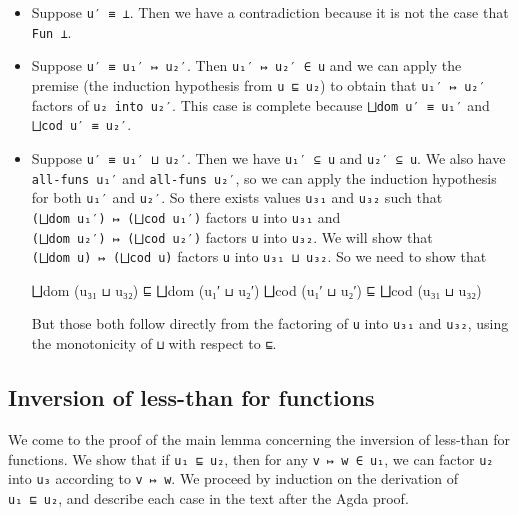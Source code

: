 \begin{itemize}
\item
  Suppose \texttt{u′\ ≡\ ⊥}. Then we have a contradiction because it is
  not the case that \texttt{Fun\ ⊥}.
\item
  Suppose \texttt{u′\ ≡\ u₁′\ ↦\ u₂′}. Then \texttt{u₁′\ ↦\ u₂′\ ∈\ u}
  and we can apply the premise (the induction hypothesis from
  \texttt{u\ ⊑\ u₂}) to obtain that \texttt{u₁′\ ↦\ u₂′} factors of
  \texttt{u₂\ into\ u₂′}. This case is complete because
  \texttt{⨆dom\ u′\ ≡\ u₁′} and \texttt{⨆cod\ u′\ ≡\ u₂′}.
\item
  Suppose \texttt{u′\ ≡\ u₁′\ ⊔\ u₂′}. Then we have \texttt{u₁′\ ⊆\ u}
  and \texttt{u₂′\ ⊆\ u}. We also have \texttt{all-funs\ u₁′} and
  \texttt{all-funs\ u₂′}, so we can apply the induction hypothesis for
  both \texttt{u₁′} and \texttt{u₂′}. So there exists values
  \texttt{u₃₁} and \texttt{u₃₂} such that
  \texttt{(⨆dom\ u₁′)\ ↦\ (⨆cod\ u₁′)} factors \texttt{u} into
  \texttt{u₃₁} and \texttt{(⨆dom\ u₂′)\ ↦\ (⨆cod\ u₂′)} factors
  \texttt{u} into \texttt{u₃₂}. We will show that
  \texttt{(⨆dom\ u)\ ↦\ (⨆cod\ u)} factors \texttt{u} into
  \texttt{u₃₁\ ⊔\ u₃₂}. So we need to show that

  \begin{myDisplay}
    ⨆dom (u₃₁ ⊔ u₃₂) ⊑ ⨆dom (u₁′ ⊔ u₂′)
    ⨆cod (u₁′ ⊔ u₂′) ⊑ ⨆cod (u₃₁ ⊔ u₃₂)
  \end{myDisplay}

  But those both follow directly from the factoring of \texttt{u} into
  \texttt{u₃₁} and \texttt{u₃₂}, using the monotonicity of \texttt{⊔}
  with respect to \texttt{⊑}.
\end{itemize}

\hypertarget{inversion-of-less-than-for-functions}{%
\subsection{Inversion of less-than for
functions}\label{inversion-of-less-than-for-functions}}

We come to the proof of the main lemma concerning the inversion of
less-than for functions. We show that if \texttt{u₁\ ⊑\ u₂}, then for
any \texttt{v\ ↦\ w\ ∈\ u₁}, we can factor \texttt{u₂} into \texttt{u₃}
according to \texttt{v\ ↦\ w}. We proceed by induction on the derivation
of \texttt{u₁\ ⊑\ u₂}, and describe each case in the text after the Agda
proof.

